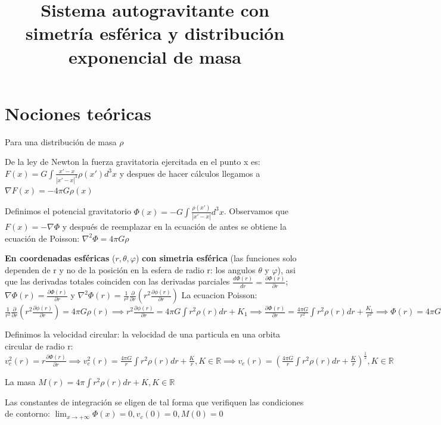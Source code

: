 \documentclass[12pt]{book}
\title{Sistema autogravitante con simetría esférica y distribución exponencial de masa}
\date{}
\begin{document}
\section*{Nociones teóricas}

Para una distribución de masa $\rho$

\begin{description}
\item De la ley de Newton la fuerza gravitatoria ejercitada en el punto x es:  $F(x) = G \int{\frac{x\prime - x}{|x\prime - x|^3}\rho(x\prime)d^3x} $ y despues de hacer cálculos llegamos a $ \nabla F(x) = -4\pi G \rho(x) $
\item Definimos el potencial gravitatorio $\Phi(x) = -G \int{\frac{\rho(x\prime)}{|x\prime - x|}d^3x} $. Observamos que $F(x) = - \nabla \Phi $ y después de reemplazar en la ecuación de antes se obtiene la ecuación de Poisson: $\nabla^2 \Phi = 4\pi G \rho $
\item \textbf{En coordenadas esféricas} ($r,\theta,\varphi$) \textbf{con simetria esférica} 
(las funciones solo dependen de r y no de la posición en la esfera de radio r: los angulos $\theta$ y $\varphi$), asi que las derivadas totales coinciden con las derivadas parciales $\frac {d\Phi(r)}{dr} = \frac{\partial \Phi(r)}{\partial r} $; 
$\nabla \Phi(r) = \frac{\partial \Phi(r)}{\partial r} $ y 
$\nabla^2 \Phi(r) = \frac{1}{r^2} \frac{\partial }{\partial r}(r^2 \frac{\partial \phi(r)}{\partial r})$
La ecuacion Poisson:$ \frac{1}{r^2} \frac{\partial }{\partial r}(r^2 \frac{\partial \phi(r)}{\partial r}) = 4\pi G \rho(r) \implies
r^2 \frac{\partial \phi(r)}{\partial r} = 4\pi G \int{r^2\rho(r)dr} + K_1 \implies
\frac{\partial \Phi(r)}{\partial r} = \frac{4 \pi G}{r^2}\int{r^2\rho(r)dr} + \frac{K_1}{r^2}\implies
\Phi(r) = 4\pi G \int{\frac{1}{r^2}(\int{r^2\rho(r)dr})dr } + K_1\int{\frac{1}{r^2}dr} + K_2
=4\pi G \int{\frac{1}{r^2}(\int{r^2\rho(r)dr})dr } + \frac{K_1}{r} + K_2, K_1, K_2 \in \mathbb{R} (el signo - con K_1)
 $
\item Definimos la velocidad circular: la velocidad de una particula en una orbita circular de radio r:
$v_c^2(r) = r\frac{\partial \Phi(r)}{\partial r} \implies
v_c^2(r) = \frac{4\pi G}{r}\int{r^2\rho(r)dr} + \frac{K}{r}, K \in \mathbb{R} \implies 
v_c(r) = (\frac{4 \pi G}{r}\int{r^2\rho(r)dr} + \frac{K}{r})^{\frac{1}{2}}, K \in \mathbb{R}
$
\item La masa $M(r) = 4 \pi \int{r^2\rho(r)dr} + K, K \in \mathbb{R}$
\item Las constantes de integración se eligen de tal forma que verifiquen las condiciones de contorno:
 $\lim_{x \to +\infty}\Phi(x) = 0, v_c(0) = 0, M(0) = 0$


\end{description}
\end{document}
